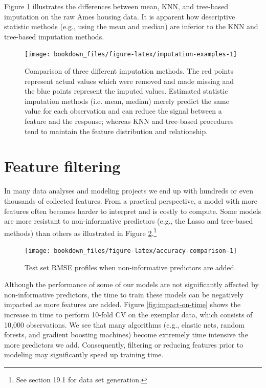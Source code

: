 \documentclass[]{krantz}
\begin{document}
Figure \ref{fig:imputation-examples} illustrates the differences between mean, KNN, and tree-based imputation on the raw Ames housing data. It is apparent how descriptive statistic methods (e.g., using the mean and median) are inferior to the KNN and tree-based imputation methods.

\begin{figure}

{\centering \texttt{[image: bookdown\_files/figure-latex/imputation-examples-1]} 

}

\caption{Comparison of three different imputation methods. The red points represent actual values which were removed and made missing and the blue points represent the imputed values. Estimated statistic imputation methods (i.e. mean, median) merely predict the same value for each observation and can reduce the signal between a feature and the response; whereas KNN and tree-based procedures tend to maintain the feature distribution and relationship.}\label{fig:imputation-examples}
\end{figure}

\hypertarget{feature-filtering}{%
\section{Feature filtering}\label{feature-filtering}}

In many data analyses and modeling projects we end up with hundreds or even thousands of collected features. From a practical perspective, a model with more features often becomes harder to interpret and is costly to compute. Some models are more resistant to non-informative predictors (e.g., the Lasso and tree-based methods) than others as illustrated in Figure \ref{fig:accuracy-comparison}.\footnote{See \citet{apm} section 19.1 for data set generation.}

\begin{figure}

{\centering \texttt{[image: bookdown\_files/figure-latex/accuracy-comparison-1]} 

}

\caption{Test set RMSE profiles when non-informative predictors are added.}\label{fig:accuracy-comparison}
\end{figure}

Although the performance of some of our models are not significantly affected by non-informative predictors, the time to train these models can be negatively impacted as more features are added. Figure \ref{fig:impact-on-time} shows the increase in time to perform 10-fold CV on the exemplar data, which consists of 10,000 observations. We see that many algorithms (e.g., elastic nets, random forests, and gradient boosting machines) become extremely time intensive the more predictors we add. Consequently, filtering or reducing features prior to modeling may significantly speed up training time.
\end{document}
